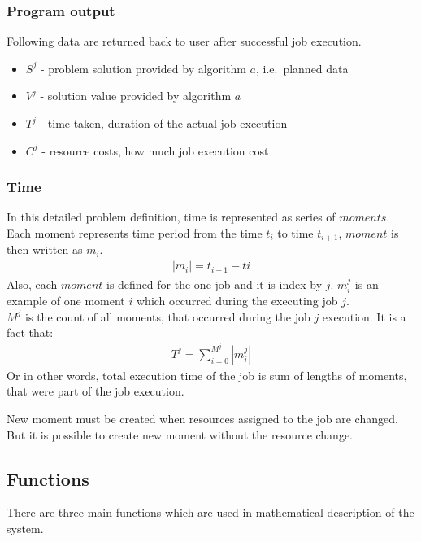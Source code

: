 \subsubsection{Program output}
Following data are returned back to user after successful job execution.
 
\begin{itemize}
	\item $S^{j}$ - problem solution provided by algorithm $a$, i.e.\ planned data
	\item $V^{j}$ - solution value provided by algorithm $a$
	\item $T^{j}$ - time taken, duration of the actual job execution
	\item $C^{j}$ - resource costs, how much job execution cost
\end{itemize}

\subsubsection{Time}
In this detailed problem definition, 
time is represented as series of $moments$.
Each moment represents time period from the time $t_i$ to time $t_{i+1}$,
$moment$ is then written as $m_i$.
\begin{align*}
	|m_{i}| = t_{i+1} - t{i} 
\end{align*}
Also, each $moment$ is defined for the one job and it is index by $j$.
$m_{i}^{j}$ is an example of one moment $i$ which occurred during the executing job $j$.\\
$M^{j}$ is the count of all moments, that occurred during the job $j$ execution.
It is a fact that:
\begin{align*}
	T^{j} = \sum_{i = 0}^{M^{j}} | m_{i}^{j} | 
\end{align*}
Or in other words, total execution time of the job is sum of lengths of moments, that were part of the job execution.

New moment must be created when resources assigned to the job are changed.
But it is possible to create new moment without the resource change.

\subsection{Functions}\label{subsec:detailed-functions}

There are three main functions which are used in mathematical description of the system.


